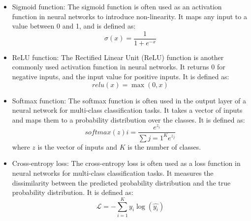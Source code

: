 \documentclass{article}[12pt]
\theoremstyle{definition}
\begin{document}
\begin{itemize}
    \item Sigmoid function: The sigmoid function is often used as an activation function in neural networks to introduce non-linearity. It maps any input to a value between 0 and 1, and is defined as:
    $$ \sigma(x) = \frac{1}{1 + e^{-x}} $$
    \item ReLU function: The Rectified Linear Unit (ReLU) function is another commonly used activation function in neural networks. It returns 0 for negative inputs, and the input value for positive inputs. It is defined as:
$$ relu(x) = \max(0, x) $$
\item Softmax function: The softmax function is often used in the output layer of a neural network for multi-class classification tasks. It takes a vector of inputs and maps them to a probability distribution over the classes. It is defined as:
$$ softmax(z)i = \frac{e^{z_i}}{\sum{j=1}^{K} e^{z_j}} $$
where $z$ is the vector of inputs and $K$ is the number of classes.
\item Cross-entropy loss: The cross-entropy loss is often used as a loss function in neural networks for multi-class classification tasks. It measures the dissimilarity between the predicted probability distribution and the true probability distribution. It is defined as:
$$ \mathcal{L} = -\sum_{i=1}^{K} y_i \log(\hat{y_i}) $$
\end{itemize}

\newpage

\bigskip
\end{document}
